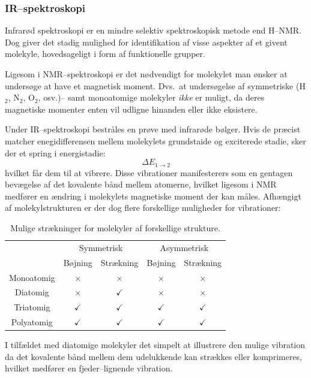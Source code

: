     \subsubsection{IR--spektroskopi}
    Infrarød spektroskopi er en mindre selektiv spektroskopisk metode end H--NMR. Dog giver det stadig mulighed for identifikation af visse aspekter af et givent molekyle, hovedsageligt i form af funktionelle grupper.

    Ligesom i NMR--spektroskopi er det nødvendigt for molekylet man ønsker at undersøge at have et magnetisk moment. Dvs.\ at undersøgelse af symmetriske (H$_2$, N$_2$, O$_2$, osv.)-- samt monoatomige molekyler \textit{ikke} er muligt, da deres magnetiske momenter enten vil udligne hinanden eller ikke eksistere.

    Under IR--spektroskopi bestråles en prøve med infrarøde bølger. Hvis de præcist matcher enegidifferensen mellem molekylets grundstaide og exciterede stadie, sker der et spring i energistadie:
    \[
        \Delta E_{1 \rightarrow 2}
    \]
    hvilket får dem til at vibrere. Disse vibrationer manifesterers som en gentagen bevægelse af det kovalente bånd mellem atomerne, hvilket ligesom i NMR medfører en ændring i molekylets magnetiske moment der kan måles. Afhængigt af molekylstrukturen er der dog flere forskellige muligheder for vibrationer:
    \begin{table}[H]\center
        \caption{Mulige strækninger for molekyler af forskellige strukture.}
        \begin{tabular}{ccccc}
            \toprule
            & \multicolumn{2}{c}{Symmetrisk} & \multicolumn{2}{c}{Asymmetrisk} \\
            \cmidrule(r){2-3} \cmidrule(r){4-5}
            & Bøjning & Strækning & Bøjning & Strækning \\
            \midrule
            Monoatomig & $\times$ & $\times$ & $\times$ & $\times$ \\
            Diatomig & $\times$ & $\checkmark$ & $\times$ & $\times$ \\
            Triatomig & $\checkmark$ & $\checkmark$ & $\checkmark$ & $\checkmark$ \\
            Polyatomig & $\checkmark$ & $\checkmark$ & $\checkmark$ & $\checkmark$ \\
            \bottomrule
        \end{tabular}
    \end{table}
    I tilfældet med diatomige molekyler det simpelt at illustrere den mulige vibration da det kovalente bånd mellem dem udelukkende kan strækkes eller komprimeres, hvilket medfører en fjeder--lignende vibration.
